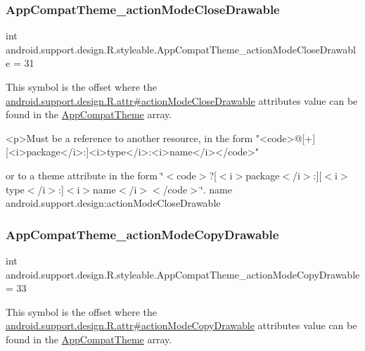 \subsubsection{\texorpdfstring{App\+Compat\+Theme\+\_\+action\+Mode\+Close\+Drawable}{AppCompatTheme\_actionModeCloseDrawable}}
{\footnotesize\ttfamily int android.\+support.\+design.\+R.\+styleable.\+App\+Compat\+Theme\+\_\+action\+Mode\+Close\+Drawable = 31\hspace{0.3cm}{\ttfamily [static]}}

This symbol is the offset where the \hyperlink{classandroid_1_1support_1_1design_1_1R_1_1attr_a9cced00fc0348684dc2d08ec0bcf9dad}{android.\+support.\+design.\+R.\+attr\#action\+Mode\+Close\+Drawable} attribute\textquotesingle{}s value can be found in the \hyperlink{classandroid_1_1support_1_1design_1_1R_1_1styleable_afb351dc8de20cbd4c89abe360373010c}{App\+Compat\+Theme} array.

\begin{DoxyVerb}      <p>Must be a reference to another resource, in the form "<code>@[+][<i>package</i>:]<i>type</i>:<i>name</i></code>"
\end{DoxyVerb}
 or to a theme attribute in the form \char`\"{}$<$code$>$?\mbox{[}$<$i$>$package$<$/i$>$\+:\mbox{]}\mbox{[}$<$i$>$type$<$/i$>$\+:\mbox{]}$<$i$>$name$<$/i$>$$<$/code$>$\char`\"{}.  name android.\+support.\+design\+:action\+Mode\+Close\+Drawable \mbox{\label{classandroid_1_1support_1_1design_1_1R_1_1styleable_afef45b44846fb895b555dc4c25849622}} 
\subsubsection{\texorpdfstring{App\+Compat\+Theme\+\_\+action\+Mode\+Copy\+Drawable}{AppCompatTheme\_actionModeCopyDrawable}}
{\footnotesize\ttfamily int android.\+support.\+design.\+R.\+styleable.\+App\+Compat\+Theme\+\_\+action\+Mode\+Copy\+Drawable = 33\hspace{0.3cm}{\ttfamily [static]}}

This symbol is the offset where the \hyperlink{classandroid_1_1support_1_1design_1_1R_1_1attr_ac3f8d06ef8dc101fffba261667ce9abf}{android.\+support.\+design.\+R.\+attr\#action\+Mode\+Copy\+Drawable} attribute\textquotesingle{}s value can be found in the \hyperlink{classandroid_1_1support_1_1design_1_1R_1_1styleable_afb351dc8de20cbd4c89abe360373010c}{App\+Compat\+Theme} array.

